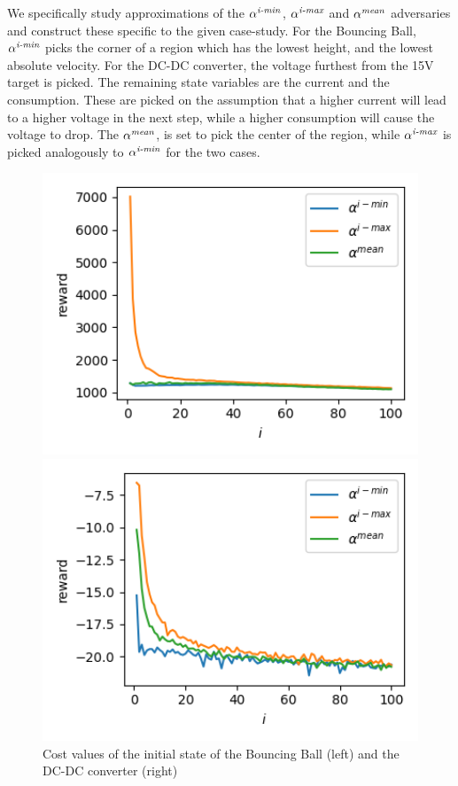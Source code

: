 \documentclass{llncs}
\begin{document}
We specifically study approximations of the $\alpha^{\emph{i-min}}$, $\alpha^{\emph{i-max}}$ and $\alpha^{\emph{mean}}$ adversaries and construct these specific to the given case-study.
For the Bouncing Ball, $\alpha^{\emph{i-min}}$ picks the corner of a region 
which has the lowest height, and the lowest absolute velocity. 
For the DC-DC converter, the voltage furthest from the 15V target is picked. 
The remaining state variables are the current and the consumption.
These are picked on the assumption that a higher current will lead to a higher voltage in the next step,
while a higher consumption will cause the voltage to drop.
The $\alpha^{\emph{mean}}$, is set to pick the center of the region, while $\alpha^{\emph{i-max}}$ is picked analogously to $\alpha^{\emph{i-min}}$ for the two cases.

\begin{figure}[t]
  \begin{minipage}{0.45\linewidth}
  \includegraphics[width=1\textwidth]{./Figures/BB.png}
  \end{minipage}
  \begin{minipage}{0.45\linewidth}
  \includegraphics[width=1\textwidth]{./Figures/DC.png}
  \end{minipage}
  \caption{Cost values of the initial state of the Bouncing Ball (left) and the DC-DC converter (right)}
  \label{fig:casestudies}
\end{figure}
\end{document}
